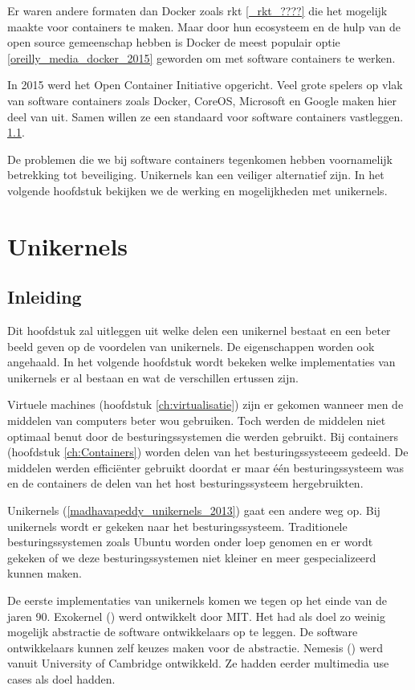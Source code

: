 \documentclass[pdftex,a4paper,12pt,twoside]{report}
\begin{document}
Er waren andere formaten dan Docker zoals rkt \ref{_rkt_????} die het mogelijk maakte voor containers te maken. Maar door hun ecosysteem en de hulp van de open source gemeenschap hebben is Docker de meest populair optie \ref{oreilly_media_docker_2015} geworden om met software containers te werken.

In 2015 werd het Open Container Initiative opgericht. Veel grote spelers op vlak van software containers zoals Docker, CoreOS, Microsoft en Google maken hier deel van uit. Samen willen ze een standaard voor software containers vastleggen. \ref{}.

De problemen die we bij software containers tegenkomen hebben voornamelijk betrekking tot beveiliging. Unikernels kan een veiliger alternatief zijn. In het volgende hoofdstuk bekijken we de werking en mogelijkheden met unikernels.

\chapter{Unikernels}
\label{ch:unikernels}

\section{Inleiding}

Dit hoofdstuk zal uitleggen uit welke delen een unikernel bestaat en een beter beeld geven op de voordelen van unikernels. De eigenschappen worden ook angehaald. In het volgende hoofdstuk wordt bekeken welke implementaties van unikernels er al bestaan en wat de verschillen ertussen zijn.

Virtuele machines (hoofdstuk \ref{ch:virtualisatie}) zijn er gekomen wanneer men de middelen van computers beter wou gebruiken. Toch werden de middelen niet optimaal benut door de besturingssystemen die werden gebruikt. Bij containers (hoofdstuk \ref{ch:Containers}) worden delen van het besturingssysteeem gedeeld. De middelen werden efficiënter gebruikt doordat er maar één besturingssysteem was en de containers de delen van het host besturingssysteem hergebruikten.

Unikernels (\ref{madhavapeddy_unikernels_2013}) gaat een andere weg op. Bij unikernels wordt er gekeken naar het besturingssysteem. Traditionele besturingssystemen zoals Ubuntu worden onder loep genomen en er wordt gekeken of we deze besturingssystemen niet kleiner en meer gespecializeerd kunnen maken.

De eerste implementaties van unikernels komen we tegen op het einde van de jaren 90. Exokernel (\cite{mit_mit_1998}) werd ontwikkelt door MIT. Het had als doel zo weinig mogelijk abstractie de software ontwikkelaars op te leggen. De software ontwikkelaars kunnen zelf keuzes maken voor de abstractie. Nemesis (\cite{university_of_cambridge_nemesis_2000}) werd vanuit University of Cambridge ontwikkeld. Ze hadden eerder multimedia use cases als doel hadden.
\end{document}
